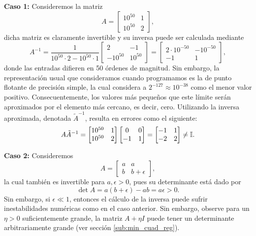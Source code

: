 \begin{mdframed}[style=discusion, frametitle={\center Matriz cuasi-singular o incorrectamente escalada}]
\noindent\textbf{Caso 1:} Consideremos la matriz 
\begin{equation*}
	A = \left[ \begin{matrix}10^{50} & 1 \\  10^{50}  & 2\end{matrix}\right],
\end{equation*}
dicha matriz es claramente invertible y su inversa puede ser calculada mediante
\begin{equation*}
	A^{-1} = \frac{1}{10^{50} \cdot 2 - 10^{50}\cdot 1}\left[ \begin{matrix}2 & -1 \\  -10^{50}  & 10^{50}\end{matrix}\right]
	=\left[ \begin{matrix}2\cdot10^{-50} & -10^{-50} \\  -1  & 1\end{matrix}\right],
\end{equation*}
donde las entradas difieren en 50 órdenes de magnitud. Sin embargo, la representación usual que consideramos cuando programamos es la de punto flotante de precisión simple, la cual considera a $2^{-127}\approx 10^{-38}$ como el menor valor positivo. Consecuentemente, los valores más pequeños que este límite serán aproximados por el elemento más cercano, es decir, cero. Utilizando la inversa aproximada, denotada $\tilde{A}^{-1}$, resulta en errores como el siguiente:
\begin{equation*}
	A\tilde{A}^{-1} = \left[ \begin{matrix}10^{50} & 1 \\  10^{50}  & 2\end{matrix}\right] \left[ \begin{matrix} 0 & 0 \\  -1  & 1\end{matrix}\right] = \left[ \begin{matrix} -1 & 1 \\  -2  & 2\end{matrix}\right] \neq {\mathbb I}.
\end{equation*}

\noindent\textbf{Caso 2:} Consideremos
\begin{equation*}
	A = \left[ \begin{matrix} a  & a \\  b  & b + \epsilon\end{matrix}\right],
\end{equation*}
la cual también es invertible para $a,\epsilon>0$, pues su determinante está dado por
\begin{equation*}
	\det{A} = a(b+\epsilon) - ab = a\epsilon>0.
\end{equation*}
Sin embargo, si $\epsilon\ll1$, entonces el cálculo de la inversa puede sufrir inestabilidades numéricas como en el caso anterior. Sin embargo, observe para un $\eta>0$ suficientemente grande, la matriz $A+\eta I$ puede tener un determinante arbitrariamente grande (ver sección \ref{sub:min_cuad_reg}).
\end{mdframed}

